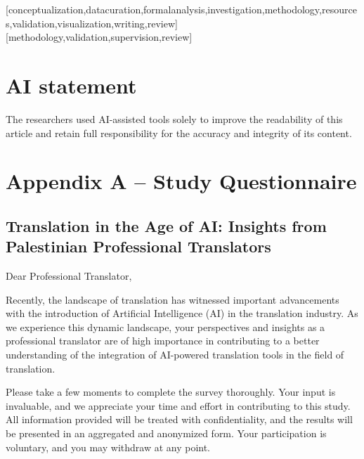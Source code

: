 \documentclass[english]{textolivre}
\begin{document}
\begin{contributors}
[conceptualization,datacuration,formalanalysis,investigation,methodology,resources,validation,visualization,writing,review]
[methodology,validation,supervision,review]
\end{contributors}

\section*{\fontsize{10}{12}\selectfont AI statement}
The researchers used AI-assisted tools solely to improve the readability of this article and retain full responsibility for the accuracy and integrity of its content.

\begin{dataavailability}
\end{dataavailability}


\appendix 

\section*{Appendix A -- Study Questionnaire}

\subsection*{Translation in the Age of AI: Insights from Palestinian Professional Translators}

Dear Professional Translator,

Recently, the landscape of translation has witnessed important advancements with the introduction of Artificial Intelligence (AI) in the translation industry. As we experience this dynamic landscape, your perspectives and insights as a professional translator are of high importance in contributing to a better understanding of the integration of AI-powered translation tools in the field of translation.

Please take a few moments to complete the survey thoroughly. Your input is invaluable, and we appreciate your time and effort in contributing to this study. All information provided will be treated with confidentiality, and the results will be presented in an aggregated and anonymized form. Your participation is voluntary, and you may withdraw at any point.
\end{document}
